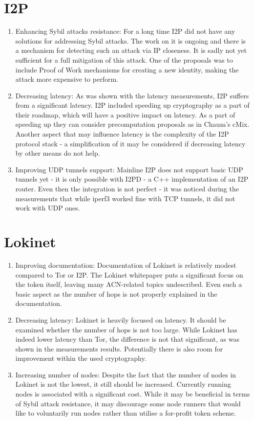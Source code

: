 \section{I2P}
\begin{enumerate}
    \item Enhancing Sybil attacks resistance: For a long time I2P did not have any solutions for addressing Sybil attacks. The work on it is ongoing and there is a mechanism for detecting such an attack via IP closeness. It is sadly not yet sufficient for a full mitigation of this attack. One of the proposals was to include Proof of Work mechanisms for creating a new identity, making the attack more expensive to perform.
    \item Decreasing latency: As was shown with the latency measurements, I2P suffers from a significant latency. I2P included speeding up cryptography as a part of their roadmap, which will have a positive impact on latency. As a part of speeding up they can consider precomputation proposals as in Chaum’s cMix. Another aspect that may influence latency is the complexity of the I2P protocol stack - a simplification of it may be considered if decreasing latency by other means do not help.
    \item Improving UDP tunnels support: Mainline I2P does not support basic UDP tunnels yet - it is only possible with I2PD - a C++ implementation of an I2P router. Even then the integration is not perfect - it was noticed during the measurements that while iperf3 worked fine with TCP tunnels, it did not work with UDP ones.
\end{enumerate}

\section{Lokinet}
\begin{enumerate}
    \item Improving documentation: Documentation of Lokinet is relatively modest compared to Tor or I2P. The Lokinet whitepaper puts a significant focus on the token itself, leaving many ACN-related topics undescribed. Even such a basic aspect as the number of hops is not properly explained in the documentation.
    \item Decreasing latency: Lokinet is heavily focused on latency. It should be examined whether the number of hops is not too large. While Lokinet has indeed lower latency than Tor, the difference is not that significant, as was shown in the measurements results. Potentially there is also room for improvement within the used cryptography.
    \item Increasing number of nodes: Despite the fact that the number of nodes in Lokinet is not the lowest, it still should be increased. Currently running nodes is associated with a significant cost. While it may be beneficial in terms of Sybil attack resistance, it may discourage some node runners that would like to voluntarily run nodes rather than utilise a for-profit token scheme.
\end{enumerate}

